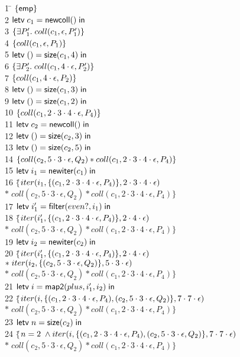 \begin{tabbing}
1 \qquad \= $\{{\mathsf{emp}}\}$ \\
2 \> $\mathsf{letv}\;c_1 = \mathsf{newcoll}()\;\mathsf{in}\;$ \\
3 \> $\{{\exists P'_1.\; coll(c_1, \epsilon, P'_1)}\}$ \\
4 \> $\{{coll(c_1, \epsilon, P_1)}\}$ \\
5 \> $\mathsf{letv}\;() = \mathsf{size}(c_1, 4)\;\mathsf{in}\;$ \\
6 \> $\{{\exists P'_2.\; coll(c_1, 4\cdot\epsilon, P'_2)}\}$ \\
7 \> $\{{coll(c_1, 4\cdot\epsilon, P_2)}\}$ \\
8 \> $\mathsf{letv}\;() = \mathsf{size}(c_1, 3)\;\mathsf{in}\;$ \\
9 \> $\mathsf{letv}\;() = \mathsf{size}(c_1, 2)\;\mathsf{in}\;$ \\
10 \> $\{{coll(c_1, 2\cdot3\cdot4\cdot\epsilon, P_4)}\}$ \\
11 \> $\mathsf{letv}\;c_2 = \mathsf{newcoll}()\;\mathsf{in}\;$ \\
12 \> $\mathsf{letv}\;() = \mathsf{size}(c_2, 3)\;\mathsf{in}\;$ \\
13 \> $\mathsf{letv}\;() = \mathsf{size}(c_2, 5)\;\mathsf{in}\;$ \\
14\> $\{{coll(c_2, 5\cdot3\cdot\epsilon, Q_2) * coll(c_1, 2\cdot3\cdot4\cdot\epsilon, P_4)}\}$ \\
15\> $\mathsf{letv}\;i_1 = \mathsf{newiter}(c_1)\;\mathsf{in}\;$ \\
16\> $\{$\=$iter(i_1, \{{(c_1, 2\cdot3\cdot4\cdot\epsilon, P_4)}\}, 2\cdot3\cdot4\cdot\epsilon)$
\\ 
  \>\>$*\; coll(c_2, 5\cdot3\cdot\epsilon, Q_2) * coll(c_1, 2\cdot3\cdot4\cdot\epsilon, P_4)\}$ \\
17 \> $\mathsf{letv}\;i'_1 = \mathsf{filter}(even?, i_1)\;\mathsf{in}\;$ \\
18 \> $\{$\=$iter(i'_1, \{{(c_1, 2\cdot3\cdot4\cdot\epsilon, P_4)}\}, 2\cdot4\cdot\epsilon)$ \\
   \>\>$*\; coll(c_2, 5\cdot3\cdot\epsilon, Q_2) * coll(c_1, 2\cdot3\cdot4\cdot\epsilon, P_4)\}$\\
19 \> $\mathsf{letv}\;i_2 = \mathsf{newiter}(c_2)\;\mathsf{in}\;$ \\
20 \> $\{$\=$iter(i'_1, \{{(c_1, 2\cdot3\cdot4\cdot\epsilon, P_4)}\}, 2\cdot4\cdot\epsilon)$\\
  \>\>$*\;iter(i_2, \{{(c_2, 5\cdot3\cdot\epsilon, Q_2)}\}, 5\cdot3\cdot\epsilon)$ \\
  \>\>$*\;coll(c_2, 5\cdot3\cdot\epsilon, Q_2) * coll(c_1, 2\cdot3\cdot4\cdot\epsilon, P_4)\}$ \\
21 \> $\mathsf{letv}\;i = \mathsf{map2}(plus, i'_1, i_2)\;\mathsf{in}\;$ \\
22 \> $\{$\=$iter(i, \{{(c_1, 2\cdot3\cdot4\cdot\epsilon, P_4), (c_2, 5\cdot3\cdot\epsilon, Q_2)}\}, 7\cdot7\cdot\epsilon)$ \\
\> \> $*\; coll(c_2, 5\cdot3\cdot\epsilon, Q_2) * coll(c_1, 2\cdot3\cdot4\cdot\epsilon, P_4)\}$ \\
23 \> $\mathsf{letv}\;n = \mathsf{size}(c_2)\;\mathsf{in}\;$ \\
24 \> $\{$\=$n = 2 \;\land
iter(i, \{{(c_1, 2\cdot3\cdot4\cdot\epsilon, P_4), (c_2, 5\cdot3\cdot\epsilon, Q_2)}\}, 7\cdot7\cdot\epsilon)$\\
\>\>$*\;coll(c_2, 5\cdot3\cdot\epsilon, Q_2) * coll(c_1, 2\cdot3\cdot4\cdot\epsilon, P_4)\}$ \\


\end{tabbing}
